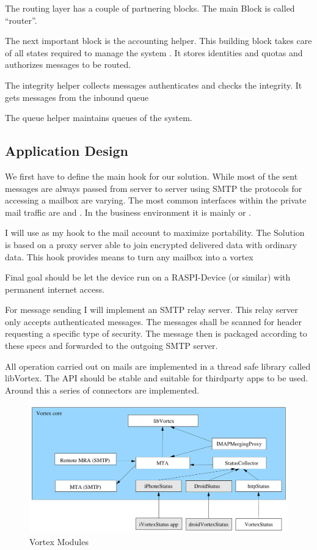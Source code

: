 The routing layer has a couple of partnering blocks. The main Block is called ``router''. 

The next important block is the accounting helper. This building block takes care of all states required to manage the system . It stores identities and quotas and authorizes messages to be routed. 

The integrity helper collects messages authenticates and checks the integrity. It gets messages from the inbound queue

The queue helper maintains queues of the system. 

\subsection{Application Design}
We first have to define the main hook for our solution. While most of the sent messages are always passed from server to server using SMTP the protocols for accessing a mailbox are varying. The most common interfaces within the private mail traffic are  and . In the business environment it is mainly  or . \par

I will use  as my hook to the mail account to maximize portability. The Solution is based on a  proxy server able to join encrypted delivered data with ordinary data. This hook provides means to turn any mailbox into a vortex\par

Final goal should be let the device run on a RASPI-Device (or similar) with permanent internet access. \par

For message sending I will implement an SMTP relay server. This relay server only accepts authenticated messages. The messages shall be scanned for header requesting a specific type of security. The message then is packaged according to these specs and forwarded to the outgoing SMTP server.

All operation carried out on mails are implemented in a thread safe library called libVortex. The API should be stable and suitable for thirdparty apps to be used. Around this a series of connectors are implemented.

\begin{figure}[H]
  \centering\includegraphics[width=\textwidth]{inc/VortexModules}
  \caption{Vortex Modules}\label{fig:VortexModules}
\end{figure}

